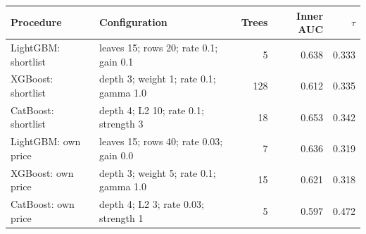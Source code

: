 \begingroup\small\begin{longtable}{@{}p{.22\linewidth}p{.41\linewidth}rrr@{}}\toprule
Procedure & Configuration & Trees & Inner AUC & $\tau$\\\midrule\endhead
LightGBM: shortlist & leaves 15; rows 20; rate 0.1; gain 0.1 & 5 & 0.638 & 0.333\\
XGBoost: shortlist & depth 3; weight 1; rate 0.1; gamma 1.0 & 128 & 0.612 & 0.335\\
CatBoost: shortlist & depth 4; L2 10; rate 0.1; strength 3 & 18 & 0.653 & 0.342\\
LightGBM: own price & leaves 15; rows 40; rate 0.03; gain 0.0 & 7 & 0.636 & 0.319\\
XGBoost: own price & depth 3; weight 5; rate 0.1; gamma 1.0 & 15 & 0.621 & 0.318\\
CatBoost: own price & depth 4; L2 3; rate 0.03; strength 1 & 5 & 0.597 & 0.472\\
\bottomrule\end{longtable}\endgroup
